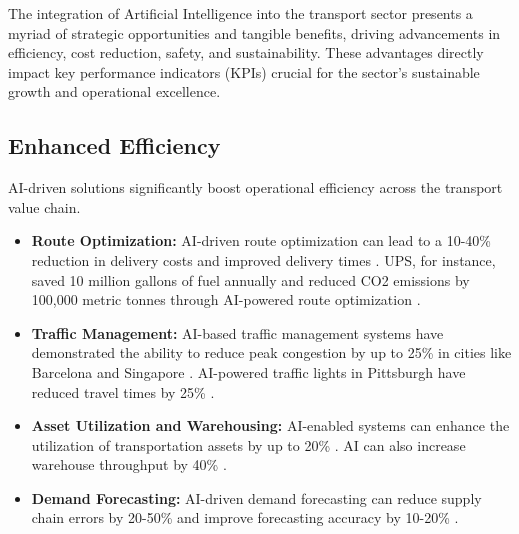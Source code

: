 The integration of Artificial Intelligence into the transport sector presents a myriad of strategic opportunities and tangible benefits, driving advancements in efficiency, cost reduction, safety, and sustainability. These advantages directly impact key performance indicators (KPIs) crucial for the sector's sustainable growth and operational excellence.

\subsection{Enhanced Efficiency}
AI-driven solutions significantly boost operational efficiency across the transport value chain.
\begin{itemize}
    \item \textbf{Route Optimization:} AI-driven route optimization can lead to a 10-40\% reduction in delivery costs and improved delivery times \cite{Medium_Benefits}. UPS, for instance, saved 10 million gallons of fuel annually and reduced CO2 emissions by 100,000 metric tonnes through AI-powered route optimization \cite{Evincedev_Benefits}.
    \item \textbf{Traffic Management:} AI-based traffic management systems have demonstrated the ability to reduce peak congestion by up to 25\% in cities like Barcelona and Singapore \cite{Prismetric_Benefits}. AI-powered traffic lights in Pittsburgh have reduced travel times by 25\% \cite{TLIMagazine_Benefits}.
    \item \textbf{Asset Utilization and Warehousing:} AI-enabled systems can enhance the utilization of transportation assets by up to 20\% \cite{ExpediteAll_Benefits}. AI can also increase warehouse throughput by 40\% \cite{SPDTech_Benefits}.
    \item \textbf{Demand Forecasting:} AI-driven demand forecasting can reduce supply chain errors by 20-50\% and improve forecasting accuracy by 10-20\% \cite{SPDTech_Benefits}.
\end{itemize}

